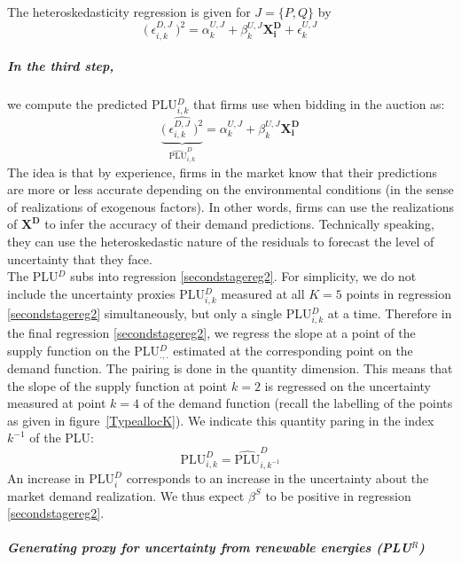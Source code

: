 The heteroskedasticity regression is given for $J=\{P,Q\}$ by
\begin{equation}
\label{heteroskedeqn}
 \bigl( \: \epsilon_{i,k}^{D,J}\: \bigr)^2= \alpha^{U,J}_{k} + \beta^{U,J}_{k} \boldsymbol{X^D_i} 
 +\epsilon^{U,J}_{k}
\end{equation}

\subparagraph{In the third step,} we compute the predicted PLU$^D_{i,k}$ that firms use when bidding in the auction as:
\begin{equation}
\label{predictu}
 \underbrace{ \widehat{ \bigl( \: \epsilon_{i,k}^{D,J}\: \bigr)^2}}_{\widehat{\text{PLU}}^D_{i,k}}= \alpha^{U,J}_{k} + \beta^{U,J}_{k} \boldsymbol{X^D_i} 
\end{equation}
The idea is that by experience, firms in the market know that their predictions are more or less accurate depending on the environmental conditions (in the sense of realizations of exogenous factors). In other words, firms can use the realizations of $ \boldsymbol{X^D}$ to infer the accuracy of their demand predictions. Technically speaking, they can use the heteroskedastic nature of the residuals to forecast the level of uncertainty that they face.\\

The PLU$^{D}$ subs into regression \ref{secondstagereg2}. 
For simplicity, we do not include the uncertainty proxies PLU$^D_{i,k}$ measured at all $K=5$ points in regression \ref{secondstagereg2} simultaneously, but only a single PLU$^D_{i,k}$ at a time. 
Therefore in the final regression \ref{secondstagereg2}, we regress the slope at a point of the supply function on the PLU$^D_{.,.}$ estimated at the corresponding point on the demand function. The pairing is done in the quantity dimension. This means that the slope of the supply function at point $k=2$ is regressed on the uncertainty measured at point $k=4$ of the demand function (recall the labelling of the points as given in figure~\ref{TypeallocK}). We indicate this quantity paring in the index $k^{-1}$ of the PLU:
\begin{equation}
\label{levelproxy}
\text{PLU}^D_{i,k} = 
\widehat{\text{PLU}}^D_{i,k^{-1}} 
\end{equation}
An increase in PLU$^D_i$ corresponds to an increase in the uncertainty about the market demand realization. We thus expect $\beta^S$ to be positive in regression \ref{secondstagereg2}.

\subparagraph{Generating proxy for uncertainty from renewable energies (PLU$^R$)}
\label{proxyautocorrel}

